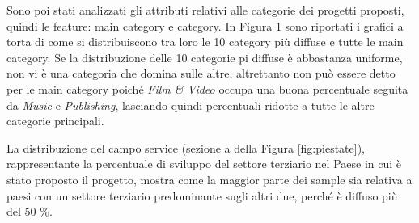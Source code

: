 Sono poi stati analizzati gli attributi relativi alle categorie dei progetti proposti, quindi le feature: main category e category. 
In Figura \ref{fig:piecategory} sono riportati i grafici a torta di come si distribuiscono tra loro le 10 category più diffuse e tutte le main category.
Se la distribuzione delle 10 categorie pi diffuse è abbastanza uniforme, non vi è una categoria che domina sulle altre, altrettanto non può essere detto per le main category poiché \textit{Film \& Video}
occupa una buona percentuale seguita da \textit{Music} e \textit{Publishing}, lasciando quindi percentuali ridotte a tutte le altre categorie principali.
\begin{figure}%
	\centering
	\qquad
	\caption{}%
	\label{fig:piecategory}%
\end{figure}

La distribuzione del campo service (sezione a della Figura \ref{fig:piestate}), rappresentante la percentuale di sviluppo del settore terziario nel Paese in cui è stato proposto il progetto, mostra come la maggior parte dei sample sia relativa a paesi con un settore terziario predominante sugli altri due, perché è diffuso più del 50 \%.   


